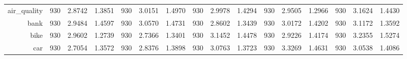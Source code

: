 \begin{table}[htbp]
{\begin{tabular}{rccccccccccccccc}
			air\_quality                        & 930                                 & \cellcolor[rgb]{ .776,  .937,  .808}\textcolor[rgb]{ 0,  .38,  0}{2.8742} & 1.3851          & 930                            & 3.0151                                                                             & 1.4970          & 930                             & 2.9978                                                                    & 1.4294          & 930                             & 2.9505                                                                    & 1.2966          & 930                             & 3.1624          & 1.4430          \\
			bank                                & 930                                 & 2.9484                                                                    & 1.4597          & 930                            & 3.0570                                                                             & 1.4731          & 930                             & \cellcolor[rgb]{ .776,  .937,  .808}\textcolor[rgb]{ 0,  .38,  0}{2.8602} & 1.3439          & 930                             & 3.0172                                                                    & 1.4202          & 930                             & 3.1172          & 1.3592          \\
			bike                                & 930                                 & 2.9602                                                                    & 1.2739          & 930                            & \cellcolor[rgb]{ .776,  .937,  .808}\textcolor[rgb]{ 0,  .38,  0}{2.7366}          & 1.3401          & 930                             & 3.1452                                                                    & 1.4478          & 930                             & 2.9226                                                                    & 1.4174          & 930                             & 3.2355          & 1.5274          \\
			car                                 & 930                                 & \cellcolor[rgb]{ .776,  .937,  .808}\textcolor[rgb]{ 0,  .38,  0}{2.7054} & 1.3572          & 930                            & 2.8376                                                                             & 1.3898          & 930                             & 3.0763                                                                    & 1.3723          & 930                             & 3.3269                                                                    & 1.4631          & 930                             & 3.0538          & 1.4086          \\

\end{tabular}}
\end{table}

